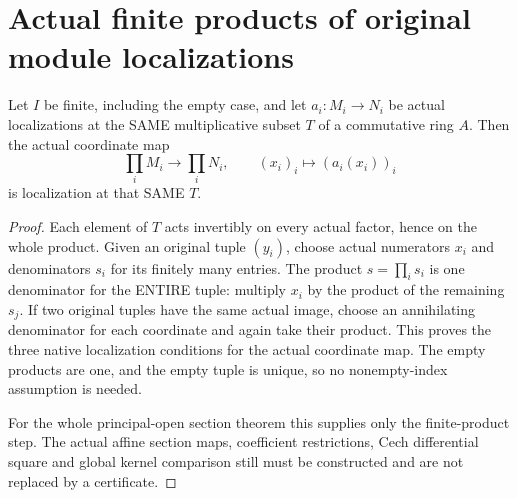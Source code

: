 \section{Actual finite products of original module localizations}

\begin{lemma}
\label{lem:finite-product-module-localization}
Let $I$ be finite, including the empty case, and let $a_i:M_i\to N_i$
be actual localizations at the SAME multiplicative subset $T$ of a
commutative ring $A$. Then the actual coordinate map
\[
 \prod_i M_i\longrightarrow\prod_i N_i,
 \qquad (x_i)_i\longmapsto(a_i(x_i))_i
\]
is localization at that SAME $T$.
\leanok
\end{lemma}
\begin{proof}
Each element of $T$ acts invertibly on every actual factor, hence
on the whole product. Given an original tuple $(y_i)$, choose actual
numerators $x_i$ and denominators $s_i$ for its finitely many entries.
The product $s=\prod_i s_i$ is one denominator for the ENTIRE tuple:
multiply $x_i$ by the product of the remaining $s_j$. If two original
tuples have the same actual image, choose an annihilating denominator
for each coordinate and again take their product. This proves the
three native localization conditions for the actual coordinate map.
The empty products are one, and the empty tuple is unique, so no
nonempty-index assumption is needed.

For the whole principal-open section theorem this supplies only the
finite-product step. The actual affine section maps, coefficient
restrictions, Cech differential square and global kernel comparison
still must be constructed and are not replaced by a certificate.
\end{proof}
